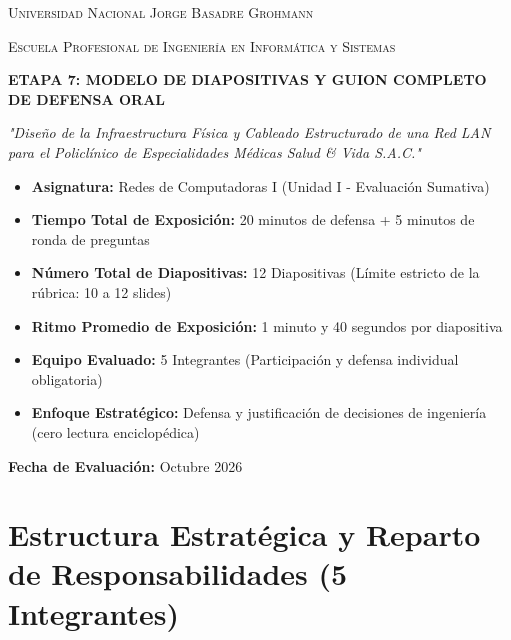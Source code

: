 \documentclass[11pt,a4paper]{article}
\begin{document}
\begin{titlepage}
    \centering
    {\scshape\LARGE Universidad Nacional Jorge Basadre Grohmann \par}
    \vspace{0.3cm}
    {\scshape\Large Escuela Profesional de Ingeniería en Informática y Sistemas \par}
    \vspace{1.5cm}
    {\color{primaryblue}\Huge\bfseries ETAPA 7: MODELO DE DIAPOSITIVAS Y GUION COMPLETO DE DEFENSA ORAL\par}
    \vspace{0.8cm}
    {\Large\itshape "Diseño de la Infraestructura Física y Cableado Estructurado de una Red LAN para el Policlínico de Especialidades Médicas Salud \& Vida S.A.C."\par}
    \vspace{1.5cm}
    
    \begin{tcolorbox}[colback=lightgray,colframe=primaryblue,title=\textbf{Ficha Técnica de la Presentación Oral},arc=2mm]
        \begin{itemize}[leftmargin=*,itemsep=2pt]
            \item \textbf{Asignatura:} Redes de Computadoras I (Unidad I - Evaluación Sumativa)
            \item \textbf{Tiempo Total de Exposición:} 20 minutos de defensa + 5 minutos de ronda de preguntas
            \item \textbf{Número Total de Diapositivas:} 12 Diapositivas (Límite estricto de la rúbrica: 10 a 12 slides)
            \item \textbf{Ritmo Promedio de Exposición:} 1 minuto y 40 segundos por diapositiva
            \item \textbf{Equipo Evaluado:} 5 Integrantes (Participación y defensa individual obligatoria)
            \item \textbf{Enfoque Estratégico:} Defensa y justificación de decisiones de ingeniería (cero lectura enciclopédica)
        \end{itemize}
    \end{tcolorbox}
    
    \vfill
    {\large \textbf{Fecha de Evaluación:} Octubre 2026 \par}
\end{titlepage}

\tableofcontents
\newpage

\section{Estructura Estratégica y Reparto de Responsabilidades (5 Integrantes)}
\end{document}

